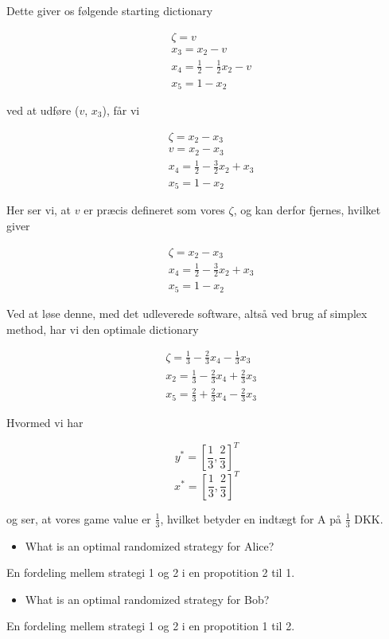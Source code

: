 \documentclass[paper=a4, fontsize=11pt]{scrartcl} %
\numberwithin{equation}{section} %
\numberwithin{figure}{section} %
\numberwithin{table}{section} %
\begin{document}
	Dette giver os følgende starting dictionary
	
	\begin{align*}
	&\zeta = v \\
	& x_3 = x_2 - v\\
	& x_4 = \frac{1}{2}-\frac{1}{2}x_2 - v \\
	& x_5 = 1 - x_2
	\end{align*}
	
	ved at udføre ($v$, $x_3$), får vi
	
	\begin{align*}
	&\zeta = x_2 - x_3\\
	&v = x_2 - x_3 \\
	&x_4 = \frac{1}{2} - \frac{3}{2}x_2+x_3\\
	&x_5 = 1 - x_2
	\end{align*}
	
	
	Her ser vi, at $v$ er præcis defineret som vores $\zeta$, og kan derfor fjernes, hvilket giver
	
	\begin{align*}
	&\zeta = x_2 - x_3\\
	&x_4 = \frac{1}{2} - \frac{3}{2}x_2 + x_3\\
	&x_5 = 1 - x_2
	\end{align*}
	
	Ved at løse denne, med det udleverede software, altså ved brug af simplex method, har vi den optimale dictionary
	
	\begin{align*}
	&\zeta = \frac{1}{3} - \frac{2}{3}x_4 - \frac{1}{3}x_3\\
	&x_2 = \frac{1}{3} - \frac{2}{3}x_4 + \frac{2}{3}x_3\\
	&x_5 = \frac{2}{3} + \frac{2}{3}x_4 - \frac{2}{3}x_3
	\end{align*}
	
	Hvormed vi har
	
	\[y^* = \left[\frac{1}{3}, \frac{2}{3}\right]^T\]
	\[x^* = \left[\frac{1}{3}, \frac{2}{3}\right]^T\]
	
	og ser, at vores game value er $\frac{1}{3}$, hvilket betyder en indtægt for A på $\frac{1}{3}$ DKK.
	
	\begin{itemize}
		\item What is an optimal randomized strategy for Alice?
	\end{itemize}
	
	En fordeling mellem strategi 1 og 2 i en propotition 2 til 1.
	
	\begin{itemize}
		\item What is an optimal randomized strategy for Bob?
	\end{itemize}
	
	En fordeling mellem strategi 1 og 2 i en propotition 1 til 2.
	
	
\end{document}
